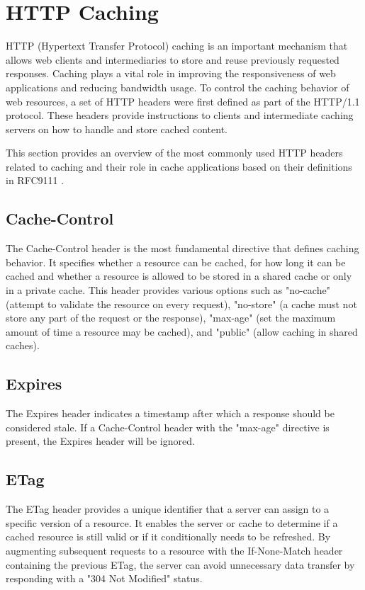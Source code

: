 \section{HTTP Caching}
\label{http_cache_policy}

HTTP (Hypertext Transfer Protocol) caching is an important mechanism that allows web clients and intermediaries to store and reuse previously requested responses. Caching plays a vital role in improving the responsiveness of web applications and reducing bandwidth usage. To control the caching behavior of web resources, a set of HTTP headers were first defined as part of the HTTP/1.1 protocol\cite{rfc2616}. These headers provide instructions to clients and intermediate caching servers on how to handle and store cached content.

This section provides an overview of the most commonly used HTTP headers related to caching and their role in cache applications based on their definitions in RFC9111 \cite{rfc9111}.

\subsection{Cache-Control} The Cache-Control header is the most fundamental directive that defines caching behavior. It specifies whether a resource can be cached, for how long it can be cached and whether a resource is allowed to be stored in a shared cache or only in a private cache. This header provides various options such as "no-cache" (attempt to validate the resource on every request), "no-store" (a cache must not store any part of the request or the response), "max-age" (set the maximum amount of time a resource may be cached), and "public" (allow caching in shared caches).

\subsection{Expires} The Expires header indicates a timestamp after which a response should be considered stale. If a Cache-Control header with the "max-age" directive is present, the Expires header will be ignored.

\subsection{ETag} The ETag header provides a unique identifier that a server can assign to a specific version of a resource. It enables the server or cache to determine if a cached resource is still valid or if it conditionally needs to be refreshed. By augmenting subsequent requests to a resource with the If-None-Match header containing the previous ETag, the server can avoid unnecessary data transfer by responding with a "304 Not Modified" status.

